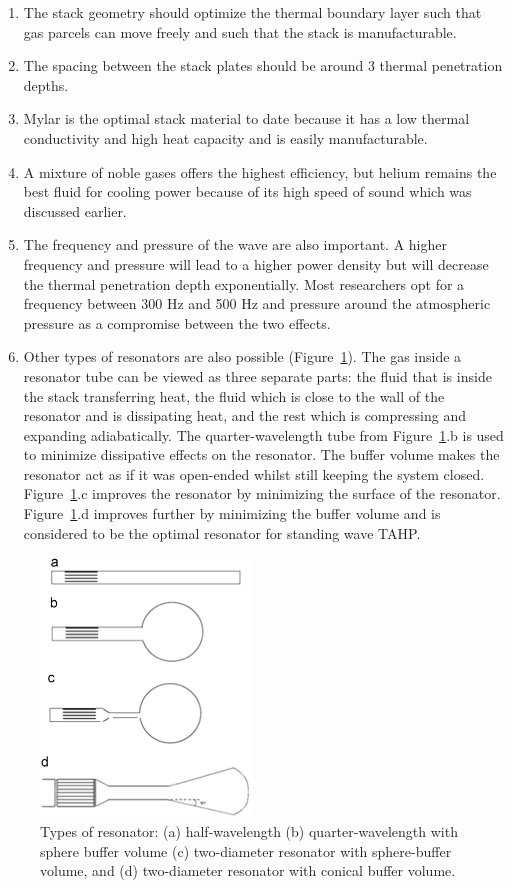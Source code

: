 \documentclass[a4paper]{article}
\begin{document}
\begin{enumerate}
  \item The stack geometry should optimize the thermal boundary layer such that gas parcels can move freely and such that the stack is manufacturable.
  \item The spacing between the stack plates should be around 3 thermal penetration depths.\cite{tijaniOptimalStack}
  \item Mylar is the optimal stack material to date because it has a low thermal conductivity and high heat capacity and is easily manufacturable.
  \item A mixture of noble gases offers the highest efficiency, but helium remains the best fluid for cooling power because of its high speed of sound which was discussed earlier.
  \item The frequency and pressure of the wave are also important. A higher frequency and pressure will lead to a higher power density but will decrease the thermal penetration depth exponentially. Most researchers opt for a frequency between 300 Hz and 500 Hz and pressure around the atmospheric pressure as a compromise between the two effects.
  \item Other types of resonators are also possible (Figure~\ref{resonators}). The gas inside a resonator tube can be viewed as three separate parts: the fluid that is inside the stack transferring heat, the fluid which is close to the wall of the resonator and is dissipating heat, and the rest which is compressing and expanding adiabatically. The quarter-wavelength tube from Figure~\ref{resonators}.b is used to minimize dissipative effects on the resonator. The buffer volume makes the resonator act as if it was open-ended whilst still keeping the system closed. Figure~\ref{resonators}.c improves the resonator by minimizing the surface of the resonator. Figure~\ref{resonators}.d improves further by minimizing the buffer volume and is considered to be the optimal resonator for standing wave TAHP.\@
\end{enumerate}
\begin{figure}[ht]
  \centering
  \includegraphics[width=0.5\textwidth]{images/resonators.png}
  \caption{Types of resonator: (a) half-wavelength (b) quarter-wavelength with sphere
    buffer volume (c) two-diameter resonator with sphere-buffer volume, and (d) two-diameter resonator with conical buffer volume.\cite{ZOLPAKAR2016626}}\label{resonators}
\end{figure}
\end{document}

